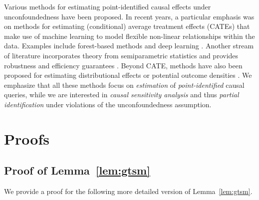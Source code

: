 \documentclass{article} %
\theoremstyle{definition}
\theoremstyle{plain}
\begin{document}
Various methods for estimating point-identified causal effects under unconfoundedness have been proposed. In recent years, a particular emphasis was on methods for estimating (conditional) average treatment effects (CATEs) that make use of machine learning to model flexible non-linear relationships within the data. Examples include forest-based methods \citep{Wager.2018} and deep learning \citep{Johansson.2016, Shalit.2017, Yoon.2018, Shi.2019}. Another stream of literature incorporates theory from semiparametric statistics and provides robustness and efficiency guarantees \citep{vanderLaan.2006, Chernozhukov.2018, Kunzel.2019, Curth.2021, Kennedy.2022d}. Beyond CATE, methods have also been proposed for estimating distributional effects or potential outcome densities \citep{Chernozhukov.2013, Muandet.2021, Kennedy.2023, Melnychuk.2023}. We emphasize that all these methods focus on \emph{estimation} of \emph{point-identified} causal queries, while we are interested in \emph{causal sensitivity analysis} and thus \emph{partial identification} under violations of the unconfoundedness assumption.

\clearpage

\section{Proofs}\label{app:proofs}

\subsection{Proof of Lemma~\ref{lem:gtsm}}

We provide a proof for the following more detailed version of Lemma~\ref{lem:gtsm}.
\end{document}
